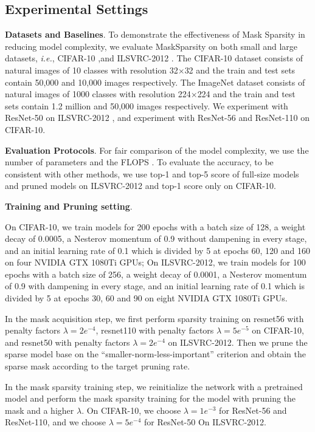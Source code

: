 \documentclass[review]{cvpr}
\begin{document}
\subsection{Experimental Settings}

\textbf{Datasets and Baselines}.
To demonstrate the effectiveness of Mask Sparsity in reducing model complexity, we evaluate MaskSparsity on both small and large datasets,  \emph{i.e.}, CIFAR-10 \cite{krizhevsky2009learning} ,and ILSVRC-2012 \cite{russakovsky2015imagenet}. The CIFAR-10 dataset consists of natural images of 10 classes with resolution 32$\times$32 and the train and test sets contain 50,000 and 10,000 images respectively. The ImageNet dataset consists of natural images of 1000 classes with resolution 224$\times$224 and the train and test sets contain 1.2 million and 50,000 images respectively.  We experiment with ResNet-50 \cite{He2016IdentityMI} on ILSVRC-2012 , and experiment with ResNet-56 \cite{he2016deep} and ResNet-110 \cite{he2016deep} on CIFAR-10.

\textbf{Evaluation Protocols}.
For fair comparison of the model complexity, we use the number of parameters and the FLOPS \cite{he2016deep}. To evaluate the accuracy, to be consistent with other methods, we use top-1 and top-5 score of full-size models and pruned models on ILSVRC-2012 and top-1 score only on CIFAR-10.

\textbf{Training and Pruning setting}.


On CIFAR-10, we train models for 200 epochs with a batch size of 128, a weight decay of 0.0005, a Nesterov momentum of 0.9 without dampening in every stage, and an initial learning rate of 0.1 which is divided by 5 at epochs 60, 120 and 160 on four NVIDIA GTX 1080Ti GPUs; On ILSVRC-2012, we train models for 100 epochs with a batch size of 256, a weight decay of 0.0001, a Nesterov momentum of 0.9 with dampening in every stage, and an initial learning rate of 0.1 which is divided by 5 at epochs 30, 60 and 90 on eight NVIDIA GTX 1080Ti GPUs.

In the mask acquisition step, we first perform sparsity training on resnet56 with penalty factors $\lambda=2e^{-4}$, resnet110 with penalty factors $\lambda=5e^{-5}$ on CIFAR-10, and resnet50 with penalty factors $\lambda=2e^{-4}$ on ILSVRC-2012. Then we prune the sparse model base on the “smaller-norm-less-important” criterion and obtain the sparse mask according to the target pruning rate. 

In the mask sparsity training step, we reinitialize the network with a pretrained model and perform the mask sparsity training for the model with pruning the mask and a higher $\lambda$. On CIFAR-10, we choose $\lambda=1e^{-3}$ for ResNet-56 and ResNet-110, and we choose $\lambda=5e^{-4}$ for ResNet-50 On ILSVRC-2012. 
\end{document}
